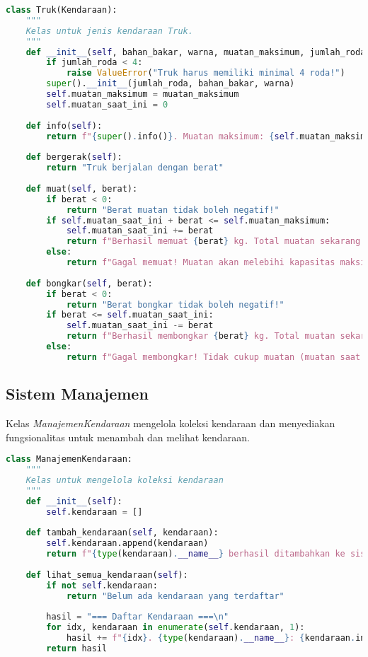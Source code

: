 \documentclass[12pt]{article}
\begin{document}
\begin{lstlisting}[language=Python, caption=Implementasi Kelas Truk]
class Truk(Kendaraan):
    """
    Kelas untuk jenis kendaraan Truk.
    """
    def __init__(self, bahan_bakar, warna, muatan_maksimum, jumlah_roda=6):
        if jumlah_roda < 4:
            raise ValueError("Truk harus memiliki minimal 4 roda!")
        super().__init__(jumlah_roda, bahan_bakar, warna)
        self.muatan_maksimum = muatan_maksimum
        self.muatan_saat_ini = 0
    
    def info(self):
        return f"{super().info()}. Muatan maksimum: {self.muatan_maksimum} kg, Muatan saat ini: {self.muatan_saat_ini} kg"
    
    def bergerak(self):
        return "Truk berjalan dengan berat"
    
    def muat(self, berat):
        if berat < 0:
            return "Berat muatan tidak boleh negatif!"
        if self.muatan_saat_ini + berat <= self.muatan_maksimum:
            self.muatan_saat_ini += berat
            return f"Berhasil memuat {berat} kg. Total muatan sekarang: {self.muatan_saat_ini} kg"
        else:
            return f"Gagal memuat! Muatan akan melebihi kapasitas maksimum {self.muatan_maksimum} kg"
    
    def bongkar(self, berat):
        if berat < 0:
            return "Berat bongkar tidak boleh negatif!"
        if berat <= self.muatan_saat_ini:
            self.muatan_saat_ini -= berat
            return f"Berhasil membongkar {berat} kg. Total muatan sekarang: {self.muatan_saat_ini} kg"
        else:
            return f"Gagal membongkar! Tidak cukup muatan (muatan saat ini: {self.muatan_saat_ini} kg)"
\end{lstlisting}

\subsection{Sistem Manajemen}
Kelas \textit{ManajemenKendaraan} mengelola koleksi kendaraan dan menyediakan fungsionalitas untuk menambah dan melihat kendaraan.

\begin{lstlisting}[language=Python, caption=Implementasi Kelas ManajemenKendaraan]
class ManajemenKendaraan:
    """
    Kelas untuk mengelola koleksi kendaraan
    """
    def __init__(self):
        self.kendaraan = []
    
    def tambah_kendaraan(self, kendaraan):
        self.kendaraan.append(kendaraan)
        return f"{type(kendaraan).__name__} berhasil ditambahkan ke sistem"
    
    def lihat_semua_kendaraan(self):
        if not self.kendaraan:
            return "Belum ada kendaraan yang terdaftar"
        
        hasil = "=== Daftar Kendaraan ===\n"
        for idx, kendaraan in enumerate(self.kendaraan, 1):
            hasil += f"{idx}. {type(kendaraan).__name__}: {kendaraan.info()}\n"
        return hasil
\end{lstlisting}
\end{document}
